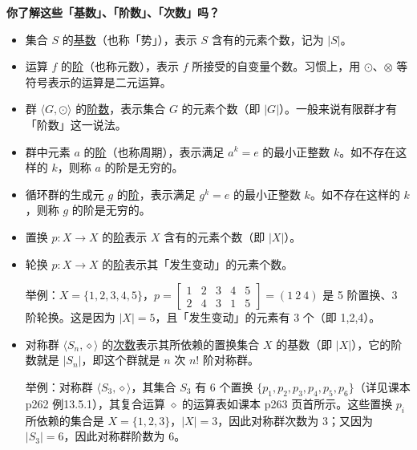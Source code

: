 \documentclass[UTF8]{ctexart}
\newcommand\Example[1]{\textcolor{cyan!70!black}{\small #1}}
\newcommand\relation[2]{\langle #1,#2 \rangle}
\newcommand\otherconcept[1]{\textcolor{green!40!black}{\underline{#1}}}
\begin{document}
\begin{tcolorbox}[colback=cyan!10, colframe=cyan!50!black, boxrule=0.5pt]
\textbf{你了解这些「基数」、「阶数」、「次数」吗？}

\begin{itemize}[itemsep=0pt, parsep=0pt]
    \item 集合 $S$ 的\otherconcept{基数}（也称「势」），表示 $S$ 含有的元素个数，记为 $|S|$。
    \item 运算 $f$ 的\otherconcept{阶}（也称元数），表示 $f$ 所接受的自变量个数。习惯上，用 $\odot$、$\otimes$ 等符号表示的运算是二元运算。
    \item 群 $\relation{G}{\odot}$ 的\otherconcept{阶数}，表示集合 $G$ 的元素个数（即 $|G|$）。一般来说有限群才有「阶数」这一说法。
    \item 群中元素 $a$ 的\otherconcept{阶}（也称周期），表示满足 $a^k=e$ 的最小正整数 $k$。如不存在这样的 $k$，则称 $a$ 的阶是无穷的。
    \item 循环群的生成元 $g$ 的\otherconcept{阶}，表示满足 $g^k=e$ 的最小正整数 $k$。如不存在这样的 $k$，则称 $g$ 的阶是无穷的。
    \item 置换 $p:X\to X$ 的\otherconcept{阶}表示 $X$ 含有的元素个数（即 $|X|$）。
    \item 轮换 $p:X\to X$ 的\otherconcept{阶}表示其「发生变动」的元素个数。
    
    \Example{举例：$X=\{1,2,3,4,5\}$，$p=\begin{bmatrix} 1&2&3&4&5 \\ 2&4&3&1&5 \end{bmatrix} = (1\ 2\ 4)$ 是 5 阶置换、3 阶轮换。这是因为 $|X|=5$，且「发生变动」的元素有 3 个（即 1,2,4）。}
    
    \item 对称群 $\relation{S_n}{\diamond}$ 的\otherconcept{次数}表示其所依赖的置换集合 $X$ 的基数（即 $|X|$），它的阶数就是 $|S_n|$，即这个群就是 $n$ 次 $n!$ 阶对称群。
        
    \Example{举例：对称群 $\relation{S_3}{\diamond}$，其集合 $S_3$ 有 6 个置换 $\{p_1,p_2,p_3,p_4,p_5,p_6\}$（详见课本 p262 例13.5.1），其复合运算 $\diamond$ 的运算表如课本 p263 页首所示。这些置换 $p_i$ 所依赖的集合是 $X=\{1,2,3\}$，$|X|=3$，因此对称群次数为 3；又因为 $|S_3|=6$，因此对称群阶数为 6。}
\end{itemize}

\end{tcolorbox}
\end{document}
